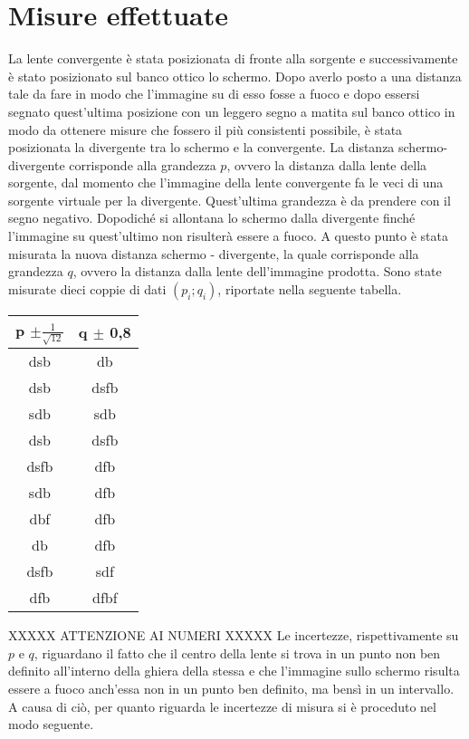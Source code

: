 \documentclass{article}
\begin{document}
	\section{Misure effettuate}
	La lente convergente è stata posizionata di fronte alla sorgente e successivamente è stato posizionato sul banco ottico lo schermo. Dopo averlo posto a una distanza tale da fare in modo che l'immagine su di esso fosse a fuoco e dopo essersi segnato quest'ultima posizione con un leggero segno a matita sul banco ottico in modo da ottenere misure che fossero il più consistenti possibile, è stata posizionata la divergente tra lo schermo e la convergente. La distanza schermo-divergente corrisponde alla grandezza $p$, ovvero la distanza dalla lente della sorgente, dal momento che l'immagine della lente convergente fa le veci di una sorgente virtuale per la divergente. Quest'ultima grandezza è da prendere con il segno negativo. Dopodiché si allontana lo schermo dalla divergente finché l'immagine su quest'ultimo non risulterà essere a fuoco. A questo punto è stata misurata la nuova distanza schermo - divergente, la quale corrisponde alla grandezza $q$, ovvero la distanza dalla lente dell'immagine prodotta. 
	Sono state misurate dieci coppie di dati $(p_{i};q_{i})$, riportate nella seguente tabella.
	\vspace*{1em}
	\begin{center}
	\begin{tabular}{cc}
		\hline
	p $\pm \frac{1}{\sqrt{12}}$  \quad [cm]	& q $\pm$ 0,8 \quad [cm] \\ %
		\hline
	dsb	& db \\
	dsb	&dsfb  \\
	sdb	&sdb  \\
	dsb	& dsfb \\
	dsfb	& dfb \\
	sdb	&  dfb\\
	dbf	& dfb \\
	db	& dfb \\
	dsfb	&sdf  \\
	dfb	&  dfbf\\
		\hline
	\end{tabular}
    \end{center}
    \vspace{1em}
    XXXXX ATTENZIONE AI NUMERI XXXXX
    Le incertezze, rispettivamente su $p$ e $q$, riguardano il fatto che il centro della lente si trova in un punto non ben definito all'interno della ghiera della stessa e che l'immagine sullo schermo risulta essere a fuoco anch'essa non in un punto ben definito, ma bensì in un intervallo. A causa di ciò, per quanto riguarda le incertezze di misura si è proceduto nel modo seguente.
\end{document}
